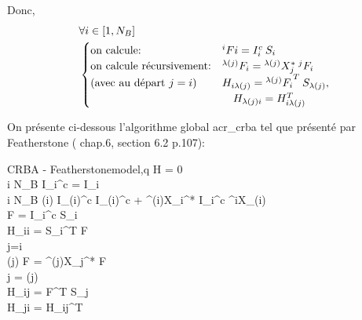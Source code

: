 \documentclass{report}
\begin{document}
\vspace{0.5cm}

\setlength{\columnseprule}{0.5pt}
\begin{multicols}{2}\raggedcolumns
\begin{flushleft}
Donc, 
\begin{align*}
&\forall i \in [1,N_B] \\
&\begin{cases}
  \textnormal{on calcule:} & ^iFi = {I_i^c} \: S_i \\
  \textnormal{on calcule récursivement:} & {^{\lambda(j)}F_i}  =  {^{\lambda(j)}X_j^*} \: {^jF_i} \\
  \textnormal{(avec au départ $j=i$)} & H_{i{\lambda(j)}} = {^{\lambda(j)}F_i}^T \: S_{\lambda(j)} , \\
                                                          & \quad H_{{\lambda(j)}i} = H_{i{\lambda(j)}}^T
\end{cases}
\end{align*}

\vspace{0.5cm}

On présente ci-dessous l'algorithme global \gls{acr_crba} tel que présenté par Featherstone (\cite{bib_featherstone} chap.6, section 6.2 p.107):
\end{flushleft}

    	\begin{spacing}{1.5}
		\begin{pseudocode}{CRBA - Featherstone}{model,q} \label{algo_crbaFeatherstone}
    H = 0 \\
		\FOR i  \TO N_B \DO
		  I_i^c = I_i \\
		\FOR i \GETS N_B  \DO
		\BEGIN
		  \IF \lambda(i) 
		  \THEN
		    I_{\lambda(i)}^c \GETS I_{\lambda(i)}^c + {^{\lambda(i)}X_i^*} \: {I_i^c} \: {^iX_{\lambda(i)}} \\
		  F = {I_i^c} \: S_i \\
		  H_{ii} = {S_i^T} F \\
		  j=i \\
		  \WHILE \lambda(j)  \DO
		  \BEGIN
		    F = {^{\lambda(j)}X_j^*} F \\
		    j = \lambda(j) \\
		    H_{ij} = F^T S_j \\
		    H_{ji} = H_{ij}^T
		  \END
		\END
	  \end{pseudocode}
	  \end{spacing}

\end{multicols}
\end{document}
